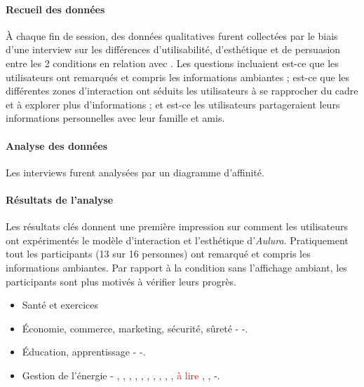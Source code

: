 \documentclass[10pt,a5paper,twoside]{article}
\begin{document}
\paragraph{Recueil des données}\label{recueil-des-donnuxe9es-2}

À chaque fin de session, des données qualitatives furent collectées par
le biais d'une interview sur les différences d'utilisabilité,
d'esthétique et de persuasion entre les 2 conditions en relation avec .
Les questions incluaient est-ce que les utilisateurs ont remarqués et
compris les informations ambiantes ; est-ce que les différentes zones
d'interaction ont séduits les utilisateurs à se rapprocher du cadre et à
explorer plus d'informations ; et est-ce les utilisateurs partageraient
leurs informations personnelles avec leur famille et amis.

\paragraph{Analyse des données}\label{analyse-des-donnuxe9es-1}

Les interviews furent analysées par un diagramme d'affinité.

\paragraph{Résultats de l'analyse}\label{ruxe9sultats-de-lanalyse-1}

Les résultats clés donnent une première impression sur comment les
utilisateurs ont expérimentés le modèle d'interaction et l'esthétique
d'\emph{Aulura}. Pratiquement tout les participants (13 sur 16
personnes) ont remarqué et compris les informations ambiantes. Par
rapport à la condition sans l'affichage ambiant, les participants sont
plus motivés à vérifier leurs progrès.

\begin{itemize}
\item
  Santé et exercices
\item
  Économie, commerce, marketing, sécurité, sûreté -
  \citet{kalnikaite2011nudge} -.
\item
  Éducation, apprentissage - \citet{reis2011perception} -.
\item
  Gestion de l'énergie - \citet{belley2006semaphore},
  \citet{belley2006coupe}, \citet{evans2009artful},
  \citet{gustafsson2005power}, \citet{kyoto2005wattson},
  \citet{jonsson2010watt}, \citet{ernevi2005energy},
  \citet{gyllensward2006visualizing}, \citet{lagerkvist2016flower},
  \citet{lagerkvist2016disappearing}, \textcolor{red}{à lire}
  \citet{rogers2010ambient}, \citet{kuznetsov2010upstream},
  \citet{valkanova2013reveal} -.
\end{itemize}

\newpage


\end{document}
